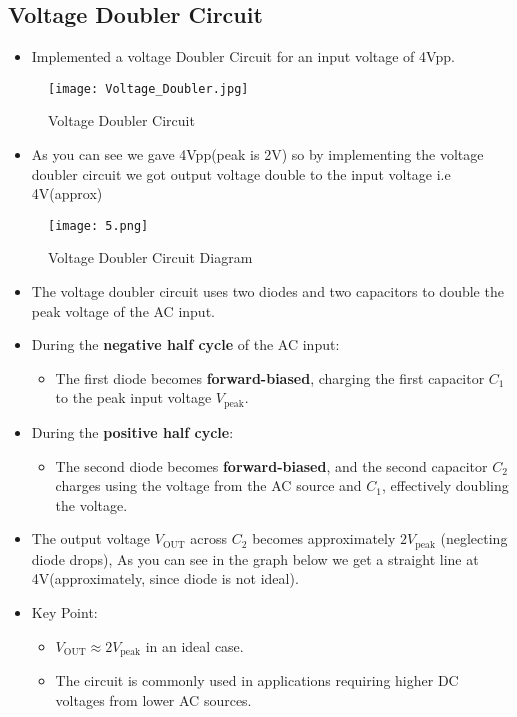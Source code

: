 \documentclass[9pt,conference]{IEEEtran}
\begin{document}
\subsection{Voltage Doubler Circuit}
\begin{itemize}
    \item Implemented a voltage Doubler Circuit for an input voltage of 4Vpp.
\end{itemize}
\begin{figure}[H]
    \centering
    \texttt{[image: Voltage\_Doubler.jpg]}
    \caption{Voltage Doubler Circuit}
    \label{fig:negative_clamper}
\end{figure}
\begin{itemize}
    \item As you can see we gave 4Vpp(peak is 2V) so by implementing the voltage doubler circuit we got output voltage double to the input voltage i.e 4V(approx)
\end{itemize}
\begin{figure}[H]
    \centering
    \texttt{[image: 5.png]}
    \caption{Voltage Doubler Circuit Diagram}
    \label{fig:positive_clamper}
\end{figure}
\begin{itemize}
    \item The voltage doubler circuit uses two diodes and two capacitors to double the peak voltage of the AC input.
    \item During the \textbf{negative half cycle} of the AC input:
    \begin{itemize}
        \item The first diode becomes \textbf{forward-biased}, charging the first capacitor \( C_1 \) to the peak input voltage \( V_{\text{peak}} \).
    \end{itemize}
    \item During the \textbf{positive half cycle}:
    \begin{itemize}
        \item The second diode becomes \textbf{forward-biased}, and the second capacitor \( C_2 \) charges using the voltage from the AC source and \( C_1 \), effectively doubling the voltage.
    \end{itemize}
    \item The output voltage \( V_{\text{OUT}} \) across \( C_2 \) becomes approximately \( 2V_{\text{peak}} \) (neglecting diode drops), As you can see in the graph below we get a straight line at 4V(approximately, since diode is not ideal).
    \item Key Point:
    \begin{itemize}
        \item \( V_{\text{OUT}} \approx 2V_{\text{peak}} \) in an ideal case.
        \item The circuit is commonly used in applications requiring higher DC voltages from lower AC sources. 
    \end{itemize}
\end{itemize}
\end{document}
